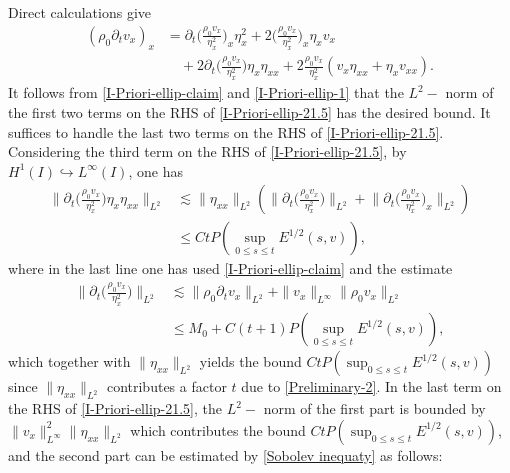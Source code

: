 \documentclass[11pt, reqno]{amsart}
\numberwithin{equation}{section}
\begin{document}
Direct calculations give
\begin{equation}\label{I-Priori-ellip-21.5}
\begin{aligned}
(\rho_0\partial_tv_x)_x
&=\partial_t\bigg({\frac{\rho_0v_x}{\eta_x^2}}\bigg)_x\eta_x^2+2\bigg({\frac{\rho_0v_x}{\eta_x^2}}\bigg)_x
\eta_xv_x\\
&\quad+2\partial_t\bigg(\frac{\rho_0v_x}{\eta_x^2}\bigg)\eta_{x}\eta_{xx}
+2\frac{\rho_0v_x}{\eta_x^2}(v_x\eta_{xx}+\eta_{x}v_{xx}).
\end{aligned}
\end{equation}
It follows from \eqref{I-Priori-ellip-claim} and \eqref{I-Priori-ellip-1} that the \(L^2-\) norm of the first two terms on the RHS of \eqref{I-Priori-ellip-21.5} has the desired bound. It suffices to handle the last two terms on the RHS of \eqref{I-Priori-ellip-21.5}. Considering the third term on the RHS of \eqref{I-Priori-ellip-21.5}, by \(H^1(I)\hookrightarrow L^\infty(I)\), one has
\begin{equation*}
\begin{aligned}
\bigg\|\partial_t\bigg({\frac{\rho_0v_x}{\eta_x^2}}\bigg)\eta_{x}\eta_{xx}\bigg\|_{L^2}&\lesssim
\|\eta_{xx}\|_{L^2}\left(\bigg\|\partial_t\bigg(\frac{\rho_0v_x}{\eta_x^2}\bigg)\bigg\|_{L^2}
+\bigg\|\partial_t\bigg(\frac{\rho_0v_x}{\eta_x^2}\bigg)_x\bigg\|_{L^2}\right)\\
&\leq Ct P(\sup_{0\leq s\leq t}E^{1/2}(s,v)),
\end{aligned}
\end{equation*}
where in the last line one has used \eqref{I-Priori-ellip-claim} and the estimate
\begin{equation}\label{I-Priori-ellip-21.6}
\begin{aligned}
\bigg\|\partial_t\bigg(\frac{\rho_0v_x}{\eta_x^2}\bigg)\bigg\|_{L^2}
&\lesssim \|\rho_0\partial_tv_x\|_{L^2}+\|v_x\|_{L^\infty}\|\rho_0v_x\|_{L^2}\\
&\leq M_0+C(t+1) P(\sup_{0\leq s\leq t}E^{1/2}(s,v)),
\end{aligned}
\end{equation}
which together with \(\|\eta_{xx}\|_{L^2}\) yields the bound \(Ct P(\sup_{0\leq s\leq t}E^{1/2}(s,v))\) since \(\|\eta_{xx}\|_{L^2}\) contributes a factor \(t\) due to \eqref{Preliminary-2}.
In the last term on the RHS of \eqref{I-Priori-ellip-21.5}, the \(L^2-\) norm of the first part is bounded by \(\|v_x\|_{L^\infty}^2\|\eta_{xx}\|_{L^2}\) which contributes the bound \(Ct P(\sup_{0\leq s\leq t}E^{1/2}(s,v))\),  and the second part can be estimated by \eqref{Sobolev inequaty} as follows:
\end{document}
